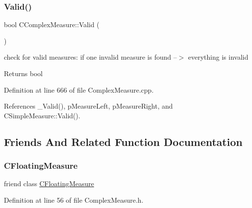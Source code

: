\mbox{\label{classCComplexMeasure_a1b777eef864d0c7a959dbeee321e881d}} 
\subsubsection{\texorpdfstring{Valid()}{Valid()}}
{\footnotesize\ttfamily bool C\+Complex\+Measure\+::\+Valid (\begin{DoxyParamCaption}{ }\end{DoxyParamCaption})}



check for valid measures\+: if one invalid measure is found --$>$ everything is invalid 

\begin{DoxyReturn}{Returns}
bool 
\end{DoxyReturn}


Definition at line 666 of file Complex\+Measure.\+cpp.



References \+\_\+\+Valid(), p\+Measure\+Left, p\+Measure\+Right, and C\+Simple\+Measure\+::\+Valid().



\subsection{Friends And Related Function Documentation}
\mbox{\label{classCComplexMeasure_a7e23751869edf87edc0feeb80eda78d9}} 
\subsubsection{\texorpdfstring{C\+Floating\+Measure}{CFloatingMeasure}}
{\footnotesize\ttfamily friend class \hyperlink{classCFloatingMeasure}{C\+Floating\+Measure}\hspace{0.3cm}{\ttfamily [friend]}}



Definition at line 56 of file Complex\+Measure.\+h.

\mbox{\label{classCComplexMeasure_ac06bbec937fbb103ef6191c80bfa5880}} 
